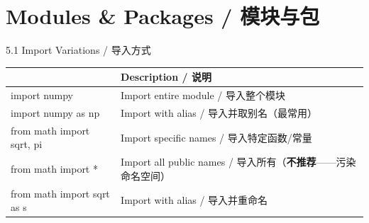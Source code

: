 \documentclass[11pt,a4paper]{report}
\begin{document}
\newpage

\chapter{Modules \& Packages / 模块与包}

\begin{cmdsection}{5.1  Import Variations / 导入方式}
\normalsize\renewcommand{\arraystretch}{1.4}
\centering
\begin{tabularx}{\textwidth}{@{}>{\ttfamily}l>{\raggedright\arraybackslash}X@{}}
\toprule
\multicolumn{1}{@{}l}{\textbf{Syntax}} & \textbf{Description / 说明} \\ \midrule
import numpy                & Import entire module / 导入整个模块 \\
import numpy as np          & Import with alias / 导入并取别名（最常用） \\
from math import sqrt, pi   & Import specific names / 导入特定函数/常量 \\
from math import *          & Import all public names / 导入所有（\textbf{不推荐}——污染命名空间） \\
from math import sqrt as s  & Import with alias / 导入并重命名 \\
\bottomrule
\end{tabularx}
\end{cmdsection}
\end{document}
